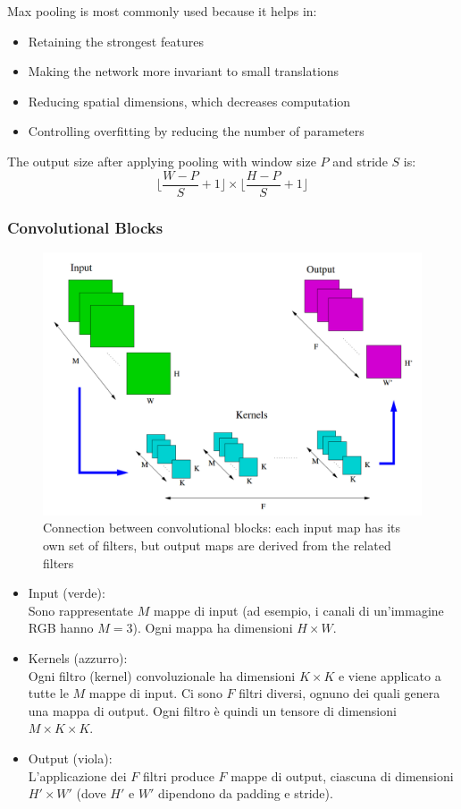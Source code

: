 Max pooling is most commonly used because it helps in:
\begin{itemize}
   \item Retaining the strongest features
   \item Making the network more invariant to small translations
   \item Reducing spatial dimensions, which decreases computation
   \item Controlling overfitting by reducing the number of parameters
\end{itemize}

The output size after applying pooling with window size $P$ and stride $S$ is:
\[\lfloor\frac{W - P}{S} + 1\rfloor \times \lfloor\frac{H - P}{S} + 1\rfloor\]

\subsubsection{Convolutional Blocks}
\begin{figure}[htbp]
   \centering
   \includegraphics{images/10/convolutionalBlocks.png}
   \caption{Connection between convolutional blocks: each input map has its own set of
filters, but output maps are derived from the related filters}
   \label{fig:10/convolutionalBlocks}
\end{figure}

\begin{itemize}
	\item Input (verde):\\
Sono rappresentate $M$ mappe di input (ad esempio, i canali di un'immagine RGB hanno $M=3$). Ogni mappa ha dimensioni $H \times W$.
	\item Kernels (azzurro):\\
Ogni filtro (kernel) convoluzionale ha dimensioni $K \times K$ e viene applicato a tutte le $M$ mappe di input.
Ci sono $F$ filtri diversi, ognuno dei quali genera una mappa di output.
Ogni filtro è quindi un tensore di dimensioni $M \times K \times K$.
	\item Output (viola):\\
L'applicazione dei $F$ filtri produce $F$ mappe di output, ciascuna di dimensioni $H' \times W'$ (dove $H'$ e $W'$ dipendono da padding e stride).
\end{itemize}


